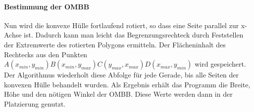 \paragraph{Bestimmung der OMBB}
Nun wird die konvexe Hülle fortlaufend rotiert, so dass eine Seite parallel zur x-Achse ist.
Dadurch kann man leicht das Begrenzungsrechteck durch Feststellen der Extremwerte des rotierten Polygons ermitteln.
Der Flächeninhalt des Rechtecks aus den Punkten $A(x_{min}, y_{min}) B(x_{min}, y_{max}) C(y_{max}, x_{max}) D(x_{max}, y_{min})$ wird gespeichert.
Der Algorithmus wiederholt diese Abfolge für jede Gerade, bis alle Seiten der konvexen Hülle behandelt wurden.
Als Ergebnis erhält das Programm die Breite, Höhe und den nötigen Winkel der OMBB.
Diese Werte werden dann in der Platzierung genutzt.
